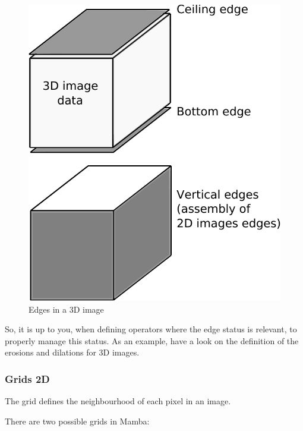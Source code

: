 \documentclass[a4paper,10pt,oneside]{article}
\begin{document}
\begin{figure}
\centering
\includegraphics[scale=0.6]{figures/3D_edges.pdf}
\caption{Edges in a 3D image}
\label{fig:3D_edges}
\end{figure}

So, it is up to you, when defining operators where the edge status is relevant, to properly
manage this status. As an example, have a look on the definition of the erosions and dilations for 3D images.

\subsubsection{Grids 2D}
\label{cha:grid2D}

The grid defines the neighbourhood of each pixel in an image.

There are two possible grids in Mamba:
\end{document}
